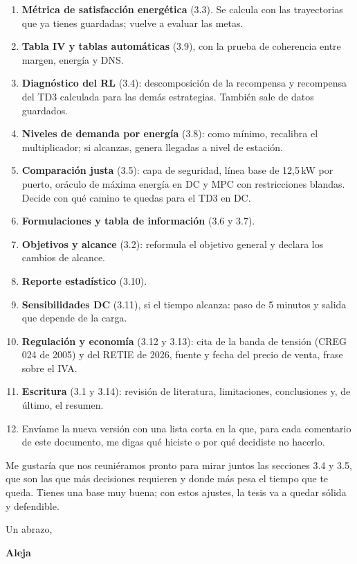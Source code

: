 \documentclass[11pt]{article}
\begin{document}
\begin{enumerate}[itemsep=4pt]
\item \textbf{Métrica de satisfacción energética} (3.3). Se calcula con las trayectorias que ya tienes guardadas; vuelve a evaluar las metas.
\item \textbf{Tabla IV y tablas automáticas} (3.9), con la prueba de coherencia entre margen, energía y DNS.
\item \textbf{Diagnóstico del RL} (3.4): descomposición de la recompensa y recompensa del TD3 calculada para las demás estrategias. También sale de datos guardados.
\item \textbf{Niveles de demanda por energía} (3.8): como mínimo, recalibra el multiplicador; si alcanzas, genera llegadas a nivel de estación.
\item \textbf{Comparación justa} (3.5): capa de seguridad, línea base de 12,5\,kW por puerto, oráculo de máxima energía en DC y MPC con restricciones blandas. Decide con qué camino te quedas para el TD3 en DC.
\item \textbf{Formulaciones y tabla de información} (3.6 y 3.7).
\item \textbf{Objetivos y alcance} (3.2): reformula el objetivo general y declara los cambios de alcance.
\item \textbf{Reporte estadístico} (3.10).
\item \textbf{Sensibilidades DC} (3.11), si el tiempo alcanza: paso de 5 minutos y salida que depende de la carga.
\item \textbf{Regulación y economía} (3.12 y 3.13): cita de la banda de tensión (CREG 024 de 2005) y del RETIE de 2026, fuente y fecha del precio de venta, frase sobre el IVA.
\item \textbf{Escritura} (3.1 y 3.14): revisión de literatura, limitaciones, conclusiones y, de último, el resumen.
\item Envíame la nueva versión con una lista corta en la que, para cada comentario de este documento, me digas qué hiciste o por qué decidiste no hacerlo.
\end{enumerate}

Me gustaría que nos reuniéramos pronto para mirar juntos las secciones 3.4 y 3.5, que son las que más decisiones requieren y donde más pesa el tiempo que te queda. Tienes una base muy buena; con estos ajustes, la tesis va a quedar sólida y defendible.

\bigskip
Un abrazo,

\smallskip
\textbf{Aleja}
\end{document}
